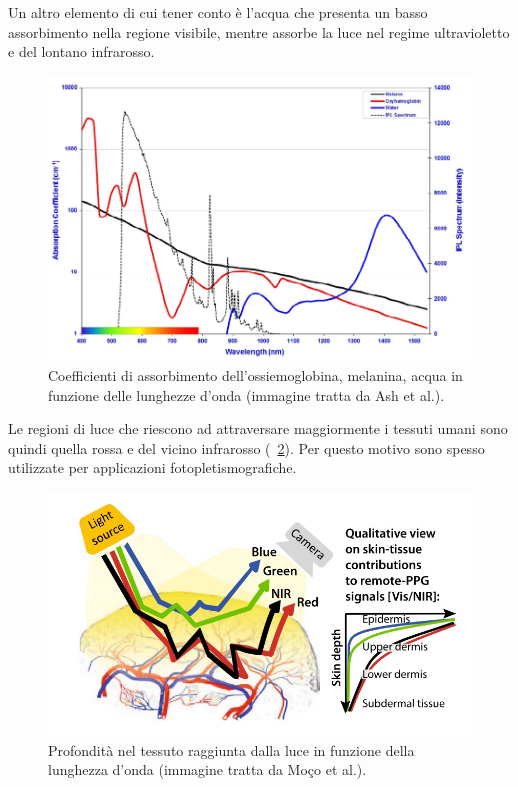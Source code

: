 Un altro elemento di cui tener conto è l'acqua che presenta un basso assorbimento nella regione visibile, mentre assorbe la luce nel regime ultravioletto e del lontano infrarosso. 
\begin{figure}[tb]
	\centering
	\includegraphics[width=1\linewidth]{ImageFiles/Fotopletismografia/PicchiAssorbimento}
	\caption{Coefficienti di assorbimento dell'ossiemoglobina, melanina, acqua in funzione delle lunghezze d'onda (immagine tratta da Ash et al.\cite{Ash2017}).}
	\label{fig:PicchiAssorbimento}
\end{figure}
Le regioni di luce che riescono ad attraversare maggiormente i tessuti umani sono quindi quella rossa e del vicino infrarosso (\Fig~\ref{fig:PenetrazioneLuce}). Per questo motivo sono spesso utilizzate per applicazioni fotopletismografiche.
\begin{figure}[tb]
	\centering
	\includegraphics[width=0.8\linewidth]{ImageFiles/Fotopletismografia/PenetrazioneLuce}
	\caption{Profondità nel tessuto raggiunta dalla luce in funzione della lunghezza d'onda (immagine tratta da Moço et al.\cite{Moco2021}).}
	\label{fig:PenetrazioneLuce}
\end{figure}
